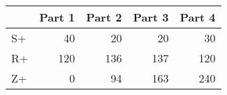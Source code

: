 \begin{tabular}{lrrrr}
\toprule
 & Part 1 & Part 2 & Part 3 & Part 4 \\
\midrule
S+ & 40 & 20 & 20 & 30 \\
R+ & 120 & 136 & 137 & 120 \\
Z+ & 0 & 94 & 163 & 240 \\
\bottomrule
\end{tabular}
